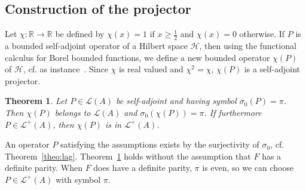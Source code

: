 \documentclass[10pt,a4paper]{article}
\newtheorem{theo}{Theorem}[section]
\theoremstyle{definition}
\numberwithin{equation}{section}
\newcommand{\R}{{\mathbb{R}}}
\newcommand{\si}{{\sigma}}
\newcommand{\lag}{\mathcal{L}}
\newcommand{\Hilb}{\mathcal{H}}
\begin{document}
\subsection{Construction of the projector}\label{sec:constr-proj}
Let $\chi : \R \rightarrow \R$ be defined by $\chi (x) =1$ if $x \geqslant
\frac{1}{2}$ and $\chi (x) =0$ otherwise. If $P$ is a bounded self-adjoint operator of a Hilbert space $\Hilb$, then using the functional calculus for Borel bounded functions, we define a new bounded operator $\chi (P)$ of $\Hilb$, cf. as instance~\cite[Theorem~VII.2]{ReSi}. Since $\chi$ is real valued and $\chi^2 = \chi$, $\chi (P)$ is a self-adjoint projector.

\begin{theo}\label{theo:constr-proj}
Let $P \in \lag (A)$ be self-adjoint and having symbol $\si_0 (P) = \pi$. Then $\chi(P)$ belongs to $\lag (A)$ and $\si_0(\chi (P)) = \pi$. If furthermore $P \in \lag ^+ (A)$, then $\chi (P)$ is in $\lag ^+ (A)$.
\end{theo}

 An operator $P$ satisfying the assumptions exists by the surjectivity of $\si_0$, cf. Theorem~\ref{theo:lag}.  Theorem~\ref{theo:constr-proj} holds without the assumption that $F$ has a definite parity. When $F$ does have a definite parity, $\pi$ is even, so we can choose $P \in \lag^{+}(A)$ with symbol $\pi$.
\end{document}
